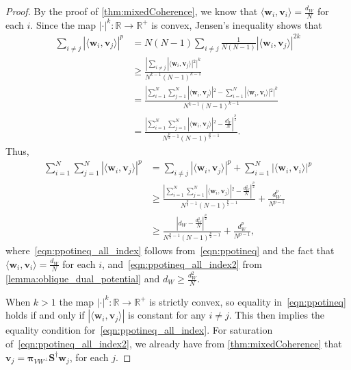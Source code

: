 \documentclass{amsart}
\numberwithin{equation}{section}
\newcommand{\bpi}{{\boldsymbol{\pi}}}
\theoremstyle{plain}
\theoremstyle{remark}
\theoremstyle{definition}
\begin{document}
\begin{proof}
By the proof of \cref{thm:mixedCoherence}, we know that 
$\langle \mathbf{w}_i, \mathbf{v}_i \rangle = \frac{d_W}{N}$ for each $i$. 
Since the map $|\cdot|^k: \mathbb{R} \rightarrow \mathbb{R}^+$ is convex, Jensen's inequality shows that
    \begin{align}
        \sum_{ i \neq j} |\langle \mathbf{w}_i, \mathbf{v}_j \rangle |^p &= N(N-1) \sum_{   i \neq j} \frac{1}{N(N-1)}|\langle \mathbf{w}_i, \mathbf{v}_j \rangle |^{2k}\nonumber\\
        &\geq  \frac{|\sum_{i \neq j} |\langle \mathbf{w}_i, \mathbf{v}_j \rangle|^2 |^{k}}{N^{k-1}(N-1)^{k-1}} \label{eqn:ppotineq}\\
        &= \frac{|\sum_{i=1}^N \sum_{j=1}^N |\langle \mathbf{w}_i, \mathbf{v}_j \rangle |^2 - \sum_{i=1}^N |\langle \mathbf{w}_i, \mathbf{v}_i \rangle|^2 |^{k}}{N^{k-1}(N-1)^{k-1}} \nonumber\\
         & = \frac{|\sum_{i=1}^N \sum_{j=1}^N |\langle \mathbf{w}_i, \mathbf{v}_j \rangle |^2 - \frac{d_W^2}{N} |^{\frac{p}{2}}}{N^{{\frac{p}{2}}-1}(N-1)^{\frac{p}{2}-1}}.\nonumber
    \end{align}
Thus, 
 \begin{align}
     \sum_{i=1}^N \sum_{j=1}^N |\langle \mathbf{w}_i, \mathbf{v}_j \rangle |^p  &=  \sum_{i \neq j} |\langle \mathbf{w}_i, \mathbf{v}_j \rangle |^p + \sum_{i=1}^N |\langle \mathbf{w}_i, \mathbf{v}_i \rangle|^p \nonumber\\
         &\geq  \frac{|\sum_{i=1}^N \sum_{j=1}^N |\langle \mathbf{w}_i, \mathbf{v}_j \rangle |^2 - \frac{d_W^2}{N} |^{\frac{p}{2}}}{N^{{\frac{p}{2}}-1}(N-1)^{\frac{p}{2}-1}} + \frac{d_W^p}{N^{p-1}} \label{eqn:ppotineq_all_index}\\
         &\geq \frac{|d_W - \frac{d_W^2}{N} |^{\frac{p}{2}}}{N^{{\frac{p}{2}}-1}(N-1)^{\frac{p}{2}-1}} + \frac{d_W^p}{N^{p-1}},\label{eqn:ppotineq_all_index2}
 \end{align}
 where~\eqref{eqn:ppotineq_all_index} follows from~\eqref{eqn:ppotineq} and the fact that $\langle \mathbf{w}_i, \mathbf{v}_i \rangle = \frac{d_W}{N}$ for each $i$, and~\eqref{eqn:ppotineq_all_index2} from \cref{lemma:oblique_dual_potential} and $d_W \geq \frac{d_W^2}{N}$.

When $k > 1$ the map $|\cdot|^k: \mathbb{R} \rightarrow \mathbb{R}^+$ is strictly convex, so equality in~\eqref{eqn:ppotineq} holds if and only if $|\langle \mathbf{w}_i, \mathbf{v}_j \rangle |$ is constant for any $i \neq j$. This then implies the equality condition for~\eqref{eqn:ppotineq_all_index}.  For saturation of~\eqref{eqn:ppotineq_all_index2}, we already have from \cref{thm:mixedCoherence} that $\mathbf{v}_j = \bpi_{VW^\perp} \mathbf{S}^\dagger \mathbf{w}_j$, for each $j$.
\end{proof}
\end{document}
